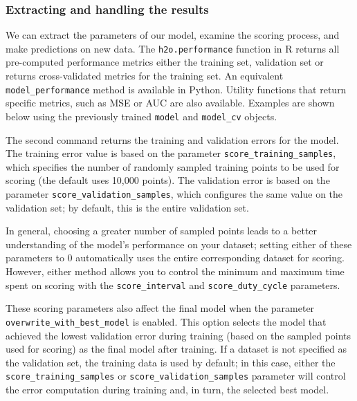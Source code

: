\waterExampleInR


\waterExampleInPython






\subsubsection{Extracting and handling the results} 

We can extract the parameters of our model, examine the scoring process, and make predictions on new data.  The \texttt{h2o.performance} function in R returns all pre-computed performance metrics either the training set, validation set or returns cross-validated metrics for the training set. An equivalent \texttt{model\_performance} method is available in Python.  Utility functions that return specific metrics, such as MSE or AUC are also available.  Examples are shown below using the previously trained \texttt{model} and \texttt{model\_cv} objects.

\newpage
\waterExampleInR


\waterExampleInPython



\noindent
The second command returns the training and validation errors for the model. The training error value is based on the parameter \texttt{score\_training\_samples}, which specifies the number of randomly sampled training points to be used for scoring (the default uses 10,000 points). The validation error is based on the parameter \texttt{score\_validation\_samples}, which configures the same value on the validation set; by default, this is the entire validation set.

In general, choosing a greater number of sampled points leads to a better understanding of the model's performance on your dataset; setting either of these parameters to 0 automatically uses the entire corresponding dataset for scoring. However, either method allows you to control the minimum and maximum time spent on scoring with the \texttt{score\_interval} and \texttt{score\_duty\_cycle} parameters.

These scoring parameters also affect the final model when the parameter \texttt{overwrite\_with\_best\_model} is enabled. This option selects the model that achieved the lowest validation error during training (based on the sampled points used for scoring) as the final model after training. If a dataset is not specified as the validation set, the training data is used by default; in this case, either the \texttt{score\_training\_samples} or \texttt{score\_validation\_samples} parameter will control the error computation during training and, in turn, the selected best model.

